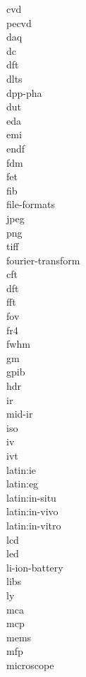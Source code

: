 \documentclass[../main.tex]{subfiles}%
\begin{document}
\gls{cvd}\\%
\gls{pecvd}\\%
\gls{daq}\\%
\gls{dc}\\%
\gls{dft}\\%
\gls{dlts}\\%
\gls{dpp-pha}\\%
\gls{dut}\\%
\gls{eda}\\%
\gls{emi}\\%
\gls{endf}\\%
\gls{fdm}\\%
\gls{fet}\\%
\gls{fib}\\%
\gls{file-formats}\\%
\gls{jpeg}\\%
\gls{png}\\%
\gls{tiff}\\%
\gls{fourier-transform}\\%
\gls{cft}\\%
\gls{dft}\\%
\gls{fft}\\%
\gls{fov}\\%
\gls{fr4}\\%
\gls{fwhm}\\%
\gls{gm}\\%
\gls{gpib}\\%
\gls{hdr}\\%
\gls{ir}\\%
\gls{mid-ir}\\%
\gls{iso}\\%
\gls{iv}\\%
\gls{ivt}\\%
\gls{latin:ie}\\%
\gls{latin:eg}\\%
\gls{latin:in-situ}\\%
\gls{latin:in-vivo}\\%
\gls{latin:in-vitro}\\%
\gls{lcd}\\%
\gls{led}\\%
\gls{li-ion-battery}\\%
\gls{libs}\\%
\gls{ly}\\%
\gls{mca}\\%
\gls{mcp}\\%
\gls{mems}\\%
\gls{mfp}\\%
\gls{microscope}\\%
\end{document}
